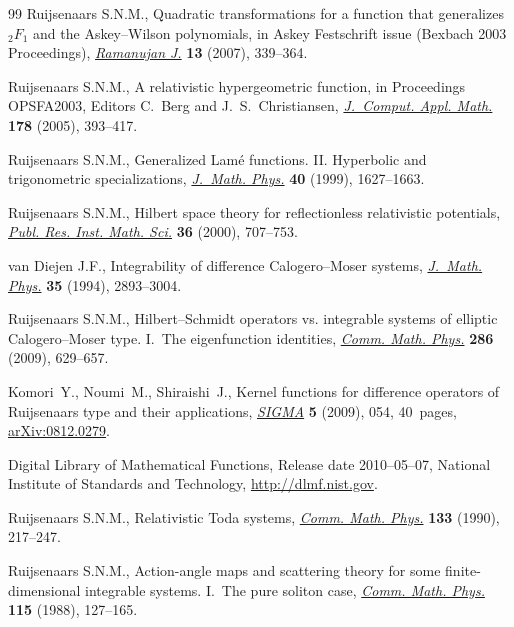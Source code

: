 \documentclass[pdftex]{sigma}
\numberwithin{equation}{section}
\begin{document}
\begin{thebibliography}{99}
Ruijsenaars S.N.M.,
Quadratic transformations for a function that generalizes ${}_2F_1$ and the Askey--Wilson polynomials,
in Askey Festschrift issue (Bexbach 2003 Proceedings),
\href{http://dx.doi.org/10.1007/s11139-006-0257-x}{{\it Ramanujan J.}} {\bf 13} (2007), 339--364.

Ruijsenaars S.N.M.,
A relativistic hypergeometric function,
in  Proceedings OPSFA2003,
Editors C.~Berg and J.~S.~Christiansen,
\href{http://dx.doi.org/10.1016/j.cam.2004.05.024}{{\it J.~Comput. Appl. Math.}} {\bf 178} (2005), 393--417.


Ruijsenaars S.N.M.,
Generalized Lam\'e functions. II. Hyperbolic and trigonometric specializations,
\href{http://dx.doi.org/10.1063/1.532823}{{\it J.~Math. Phys.}} {\bf 40} (1999),  1627--1663.

Ruijsenaars S.N.M.,
Hilbert space theory for ref\/lectionless relativistic potentials,
\href{http://dx.doi.org/10.2977/prims/1195139643}{{\it Publ. Res. Inst. Math. Sci.}} {\bf 36} (2000), 707--753.


van Diejen J.F.,
Integrability of dif\/ference Calogero--Moser systems,
\href{http://dx.doi.org/10.1063/1.530498}{{\it J.~Math. Phys.}} {\bf 35} (1994), 2893--3004.

Ruijsenaars S.N.M.,
Hilbert--Schmidt operators vs. integrable systems of elliptic Calogero--Moser type. I.~The eigenfunction identities,
\href{http://dx.doi.org/10.1007/s00220-008-0707-y}{{\it Comm. Math. Phys.}} {\bf 286} (2009), 629--657.

Komori~Y., Noumi~M., Shiraishi~J.,
Kernel functions for dif\/ference operators of Ruijsenaars type and their applications,
\href{http://dx.doi.org/10.3842/SIGMA.2009.054}{{\it SIGMA}} {\bf 5} (2009), 054, 40~pages,
\href{http://arxiv.org/abs/0812.0279}{arXiv:0812.0279}.

Digital Library of Mathematical Functions,
Release date 2010--05--07, National Institute of Standards and Technology, \url{http://dlmf.nist.gov}.

Ruijsenaars S.N.M.,
Relativistic Toda systems,
\href{http://dx.doi.org/10.1007/BF02097366}{{\it Comm. Math. Phys.}} {\bf 133} (1990), 217--247.

Ruijsenaars S.N.M.,
Action-angle maps and scattering theory for some f\/inite-dimensional integrable systems. I.~The pure soliton case,
\href{http://dx.doi.org/10.1007/BF01238855}{{\it Comm. Math. Phys.}} {\bf 115} (1988), 127--165.



\end{thebibliography}
\end{document}
